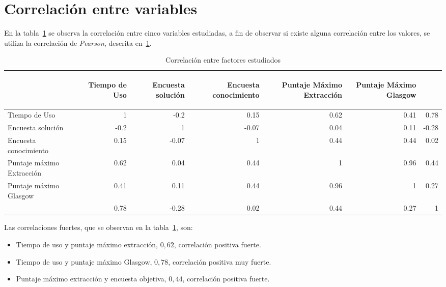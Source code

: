 \section{Correlación entre variables}
\label{sec:correlacion}

En la tabla~\ref{tab:all_correlation} se observa la correlación entre cinco
variables estudiadas, a fin de observar si existe alguna correlación entre los
valores, se utiliza la correlación de \emph{Pearson}, descrita
en~\ref{sec:correlacion}.

\begin{table}[H]
\centering
\begin{tabular}{lrrrrrr}
\toprule
        &
\begin{sideways}\textbf{Tiempo de Uso}\end{sideways}             &
\begin{sideways}\textbf{Encuesta solución}\end{sideways}        &
\begin{sideways}\textbf{Encuesta conocimiento}\end{sideways}         &
\begin{sideways}\textbf{Puntaje Máximo Extracción}\end{sideways} &
\begin{sideways}\textbf{Puntaje Máximo Glasgow}\end{sideways}    \\
\midrule
Tiempo de Uso             & 1    & -0.2  & 0.15  & 0.62 & 0.41 & 0.78 \\
Encuesta solución         & -0.2 & 1     & -0.07 & 0.04 & 0.11 & -0.28\\
Encuesta conocimiento     & 0.15 & -0.07 & 1     & 0.44 & 0.44 & 0.02 \\
Puntaje máximo Extracción & 0.62 & 0.04  & 0.44  & 1    & 0.96 & 0.44 \\
Puntaje máximo Glasgow    & 0.41 & 0.11  & 0.44  & 0.96 & 1    & 0.27 \\
\bottomrule               & 0.78 & -0.28 & 0.02  & 0.44 & 0.27 & 1    \\
\end{tabular}
\caption{Correlación entre factores estudiados} 
\label{tab:all_correlation}
\end{table}

Las correlaciones fuertes, que se observan en la
tabla~\ref{tab:all_correlation}, son:

\begin{itemize}
    \item Tiempo de uso y puntaje máximo extracción, $0,62$, correlación
        positiva fuerte.
    \item Tiempo de uso y puntaje máximo Glasgow, $0,78$, correlación positiva
        muy fuerte.
    \item Puntaje máximo extracción y encuesta objetiva, $0,44$, correlación
        positiva fuerte.
\end{itemize}


